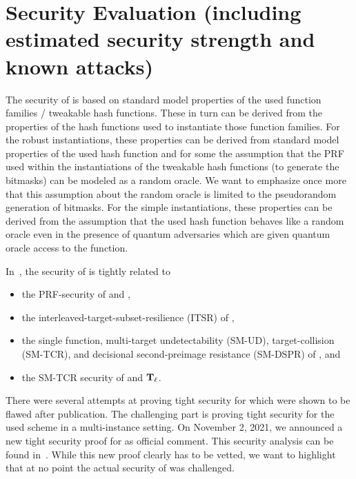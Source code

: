 \section{Security Evaluation (including estimated security strength and known attacks)}
\label{sec:security}
The security of \spx is based on standard model properties of the used function 
families / tweakable hash functions. These in turn can be derived from the properties of the hash functions
used to instantiate those function families. For the robust instantiations, these 
properties can be derived from standard model properties of the used hash 
function and for some the assumption that the PRF used within the instantiations of the 
tweakable hash functions (to generate the bitmasks) can be modeled as a random 
oracle. We want to emphasize once more that this assumption about the random oracle 
is limited to the pseudorandom generation of bitmasks. 
For the simple instantiations, these properties can be derived from the 
assumption that the used hash function behaves like a random oracle even 
in the presence of quantum adversaries which are given quantum oracle access 
to the function. 

In~\cite{NewProof}, the security of \spx is tightly related to 
\begin{itemize}
 \item the PRF-security of \sphincsPRF and \sphincsPRFmsg,
 \item the interleaved-target-subset-resilience (ITSR) of \sphincsHmsg,
 \item the single function, multi-target undetectability (SM-UD), target-collision (SM-TCR), and decisional second-preimage resistance (SM-DSPR) of \sphincsF, and
 \item the SM-TCR security of \sphincsH and $\mathbf{T}_\ell$.
\end{itemize}

%               


There were several attempts at proving tight security for \spx which were shown to be flawed after publication. The challenging part is proving tight security for the used \wots scheme in a multi-instance setting. On November 2, 2021, we announced a new tight security proof for \spx as official comment. This security analysis can be found in~\cite{NewProof}. While this new proof clearly has to be vetted, we want to highlight that at no point the actual security of \spx was challenged. 


